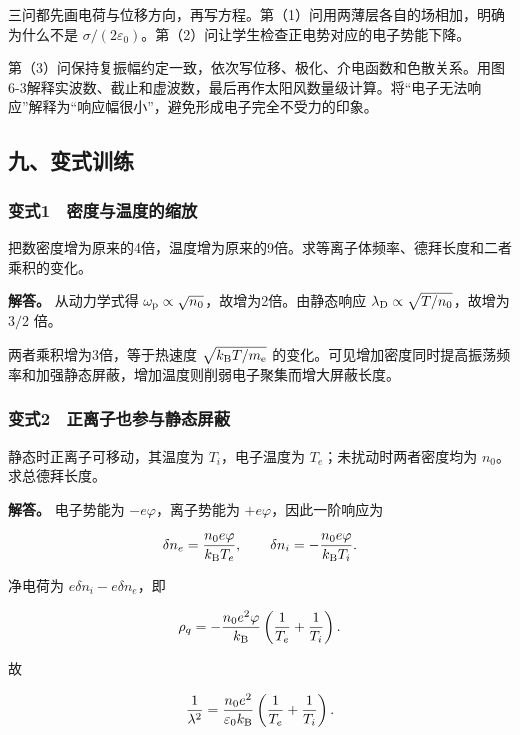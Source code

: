 \documentclass[12pt,a4paper,fontset=fandol]{ctexart}
\begin{document}
三问都先画电荷与位移方向，再写方程。第（1）问用两薄层各自的场相加，明确为什么不是
\(\sigma/(2\varepsilon_0)\)。第（2）问让学生检查正电势对应的电子势能下降。

第（3）问保持复振幅约定一致，依次写位移、极化、介电函数和色散关系。用图6-3解释实波数、截止和虚波数，最后再作太阳风数量级计算。将``电子无法响应''解释为``响应幅很小''，避免形成电子完全不受力的印象。

\subsection{九、变式训练}\label{ux4e5dux53d8ux5f0fux8badux7ec3-5}

\subsubsection{变式1　密度与温度的缩放}\label{ux53d8ux5f0f1-ux5bc6ux5ea6ux4e0eux6e29ux5ea6ux7684ux7f29ux653e}

把数密度增为原来的4倍，温度增为原来的9倍。求等离子体频率、德拜长度和二者乘积的变化。

\textbf{解答。} 从动力学式得
\(\omega_{\rm p}\propto\sqrt{n_0}\)，故增为2倍。由静态响应
\(\lambda_{\rm D}\propto\sqrt{T/n_0}\)，故增为 \(3/2\) 倍。

两者乘积增为3倍，等于热速度 \(\sqrt{k_{\rm B}T/m_{\rm e}}\)
的变化。可见增加密度同时提高振荡频率和加强静态屏蔽，增加温度则削弱电子聚集而增大屏蔽长度。

\subsubsection{变式2　正离子也参与静态屏蔽}\label{ux53d8ux5f0f2-ux6b63ux79bbux5b50ux4e5fux53c2ux4e0eux9759ux6001ux5c4fux853d}

静态时正离子可移动，其温度为 \(T_i\)，电子温度为
\(T_e\)；未扰动时两者密度均为 \(n_0\)。求总德拜长度。

\textbf{解答。} 电子势能为 \(-e\varphi\)，离子势能为
\(+e\varphi\)，因此一阶响应为

\[
\delta n_e=\frac{n_0e\varphi}{k_{\rm B}T_e},\qquad
\delta n_i=-\frac{n_0e\varphi}{k_{\rm B}T_i}.
\]

净电荷为 \(e\delta n_i-e\delta n_e\)，即

\[
\rho_q=-\frac{n_0e^2\varphi}{k_{\rm B}}
\left(\frac1{T_e}+\frac1{T_i}\right).
\]

故

\[
\frac1{\lambda^2}=\frac{n_0e^2}{\varepsilon_0k_{\rm B}}
\left(\frac1{T_e}+\frac1{T_i}\right).
\]
\end{document}
